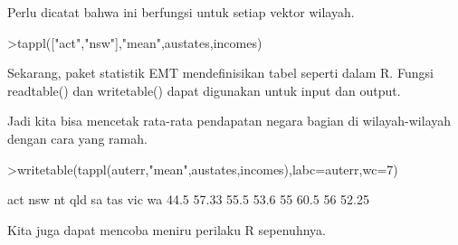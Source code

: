 \documentclass[12pt,arial,letterpaper]{book}
\begin{document}
\begin{eulercomment}
\begin{eulercomment}
\begin{eulercomment}
\begin{eulercomment}
\begin{eulercomment}
\begin{eulercomment}
\begin{eulercomment}
\begin{eulercomment}
\begin{eulercomment}
\begin{eulercomment}
\begin{eulercomment}
\begin{eulercomment}
\begin{eulercomment}
\begin{eulercomment}
\begin{eulercomment}
\begin{eulercomment}
\begin{eulercomment}
\begin{eulercomment}
\begin{eulercomment}
\begin{eulercomment}
\begin{eulercomment}
\begin{eulercomment}
\begin{eulercomment}
\begin{eulercomment}
\begin{eulercomment}
\begin{eulercomment}
\begin{eulercomment}
\begin{eulercomment}
\begin{eulercomment}
\begin{eulercomment}
\begin{eulercomment}
\begin{eulercomment}
\begin{eulercomment}
\begin{eulercomment}
\begin{eulercomment}
\begin{eulercomment}
\begin{eulercomment}
Perlu dicatat bahwa ini berfungsi untuk setiap vektor wilayah.
\end{eulercomment}
\begin{eulerprompt}
>tappl(["act","nsw"],"mean",austates,incomes)
\end{eulerprompt}
\begin{euleroutput}
  [44.5,  57.3333333333]
\end{euleroutput}
\begin{eulercomment}
Sekarang, paket statistik EMT mendefinisikan tabel seperti dalam R.
Fungsi readtable() dan writetable() dapat digunakan untuk input dan
output.

Jadi kita bisa mencetak rata-rata pendapatan negara bagian di
wilayah-wilayah dengan cara yang ramah.
\end{eulercomment}
\begin{eulerprompt}
>writetable(tappl(auterr,"mean",austates,incomes),labc=auterr,wc=7)
\end{eulerprompt}
\begin{euleroutput}
      act    nsw     nt    qld     sa    tas    vic     wa
     44.5  57.33   55.5   53.6     55   60.5     56  52.25
\end{euleroutput}
\begin{eulercomment}
Kita juga dapat mencoba meniru perilaku R sepenuhnya.


\end{eulercomment}
\end{eulercomment}
\end{eulercomment}
\end{eulercomment}
\end{eulercomment}
\end{eulercomment}
\end{eulercomment}
\end{eulercomment}
\end{eulercomment}
\end{eulercomment}
\end{eulercomment}
\end{eulercomment}
\end{eulercomment}
\end{eulercomment}
\end{eulercomment}
\end{eulercomment}
\end{eulercomment}
\end{eulercomment}
\end{eulercomment}
\end{eulercomment}
\end{eulercomment}
\end{eulercomment}
\end{eulercomment}
\end{eulercomment}
\end{eulercomment}
\end{eulercomment}
\end{eulercomment}
\end{eulercomment}
\end{eulercomment}
\end{eulercomment}
\end{eulercomment}
\end{eulercomment}
\end{eulercomment}
\end{eulercomment}
\end{eulercomment}
\end{eulercomment}
\end{eulercomment}
\end{document}
